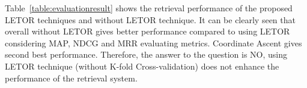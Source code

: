 \begin{table}
\centering
{}
\caption{Evaluation Results} \label{table:evaluationresult}
\end{table}

Table~\ref{table:evaluationresult} shows the retrieval performance of the proposed LETOR techniques and without LETOR technique. It can be clearly seen
that overall without LETOR gives better performance compared to using LETOR considering MAP, NDCG and MRR evaluating metrics. Coordinate Ascent gives second best 
performance. Therefore, the answer to the question is NO, using LETOR technique (without K-fold Cross-validation) does not enhance the performance of the retrieval system.

